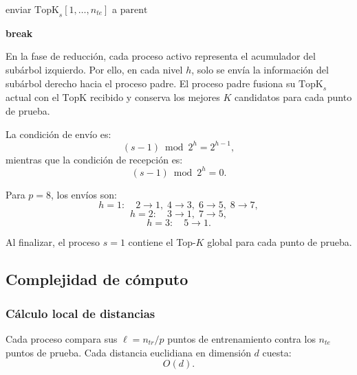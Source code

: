 \documentclass[11pt,a4paper]{article}
\begin{document}
\begin{algorithm}[H]
{{        enviar $\mathrm{TopK}_s[1,\dots,n_{te}]$ a $\mathrm{parent}$\;
        
        \textbf{break}\;
    }
    
    \BlankLine
}

\BlankLine
{}
\end{algorithm}

En la fase de reducción, cada proceso activo representa el acumulador del subárbol izquierdo.
Por ello, en cada nivel $h$, solo se envía la información del subárbol derecho hacia el proceso
padre. El proceso padre fusiona su $\mathrm{TopK}_s$ actual con el $\mathrm{TopK}$ recibido y conserva
los mejores $K$ candidatos para cada punto de prueba.

La condición de envío es:
\[
(s-1) \bmod 2^h = 2^{h-1},
\]
mientras que la condición de recepción es:
\[
(s-1) \bmod 2^h = 0.
\]

Para $p=8$, los envíos son:
\[
h=1: \quad 2\to1,\;4\to3,\;6\to5,\;8\to7,
\]
\[
h=2: \quad 3\to1,\;7\to5,
\]
\[
h=3: \quad 5\to1.
\]

Al finalizar, el proceso $s=1$ contiene el Top-$K$ global para cada punto de prueba.

\subsection{Complejidad de cómputo}

\subsubsection{Cálculo local de distancias}

Cada proceso compara sus $\ell = n_{tr}/p$ puntos de entrenamiento contra los $n_{te}$ puntos
de prueba. Cada distancia euclidiana en dimensión $d$ cuesta:
\[
O(d).
\]
\end{document}
